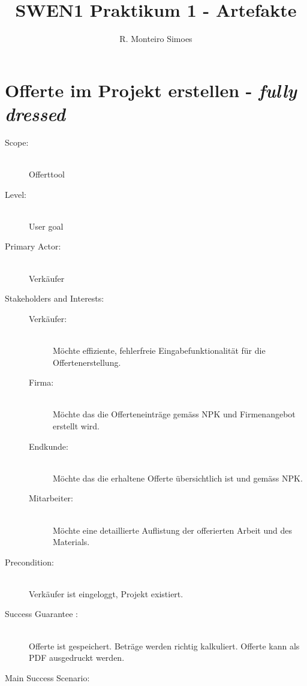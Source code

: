 \documentclass[a4paper,12pt]{article}
\begin{document}
	
	\title{SWEN1 Praktikum 1 - Artefakte}
	\author{ R. Monteiro Simoes}
	\maketitle

	\newpage

	\tableofcontents

	\newpage
	
	\section{Offerte im Projekt erstellen - \emph{fully dressed}}
	
	\begin{description}
		\item[Scope:] \hfill  \\Offerttool
		\item[Level:] \hfill \\User goal
		\item[Primary Actor:] \hfill \\Verkäufer
		\item[Stakeholders and Interests:] \hfill 
		\begin{description}
			\item[Verkäufer:]\hfill \\Möchte effiziente, fehlerfreie Eingabefunktionalität 
			für die Offertenerstellung.
			\item[Firma:]\hfill \\Möchte das die Offerteneinträge gemäss 
			NPK und Firmenangebot erstellt wird.
			\item[Endkunde:]\hfill \\Möchte das die erhaltene Offerte 
			übersichtlich ist und gemäss NPK.
			\item[Mitarbeiter:]\hfill \\Möchte eine detaillierte Auflistung der
			offerierten Arbeit und des Materials.  
		\end{description}
		\item[Precondition:] \hfill \\Verkäufer ist eingeloggt, Projekt existiert. 
		\item[Success Guarantee :] \hfill \\Offerte ist gespeichert. Beträge
		werden richtig kalkuliert. Offerte kann als PDF ausgedruckt werden. 
		\item[Main Success Scenario:] \hfill  
		\begin{enumerate}

\end{enumerate}
\end{description}
\end{document}
